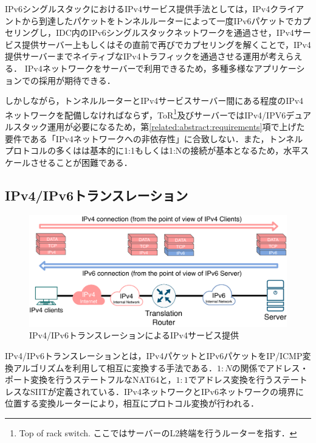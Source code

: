 IPv6シングルスタックにおけるIPv4サービス提供手法としては，IPv4クライアントから到達したパケットをトンネルルーターによって一度IPv6パケットでカプセリングし，IDC内のIPv6シングルスタックネットワークを通過させ，IPv4サービス提供サーバー上もしくはその直前で再びでカプセリングを解くことで，IPv4提供サーバーまでネイティブなIPv4トラフィックを通過させる運用が考えらえる．
IPv4ネットワークをサーバーで利用できるため，多種多様なアプリケーションでの採用が期待できる．

しかしながら，トンネルルーターとIPv4サービスサーバー間にある程度のIPv4ネットワークを配備しなければならず，ToR\footnote{Top of rack switch. ここではサーバーのL2終端を行うルーターを指す．}及びサーバーではIPv4/IPV6デュアルスタック運用が必要になるため，第\ref{related:abstract:requirements}項で上げた要件である「IPv4ネットワークへの非依存性」に合致しない．また，トンネルプロトコルの多く\cite{6799698}はは基本的に1:1もしくは1:Nの接続が基本となるため，水平スケールさせることが困難である．



\subsection{IPv4/IPv6トランスレーション}
\label{related:compare:translation}
\begin{figure}[h]
    \begin{center}
      \includegraphics[width=15cm,pagebox=cropbox,clip]{img/translation_model.pdf}
    \end{center}
    \caption{IPv4/IPv6トランスレーションによるIPv4サービス提供}
    \label{fig:tunneling_model}
\end{figure}

IPv4/IPv6トランスレーションとは，IPv4パケットとIPv6パケットをIP/ICMP変換アルゴリズムを利用して相互に変換する手法である．$1:N$の関係でアドレス・ポート変換を行うステートフルなNAT64\cite{RFC6146}と，$1:1$でアドレス変換を行うステートレスなSIIT\cite{RFC7915}が定義されている．IPv4ネットワークとIPv6ネットワークの境界に位置する変換ルーターにより，相互にプロトコル変換が行われる．

